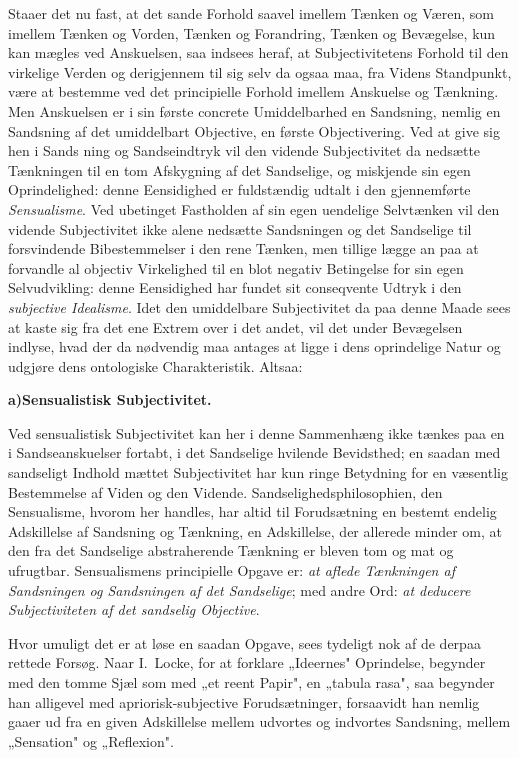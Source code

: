 \documentclass[12pt]{book}
\newcommand{\opage}[1]{\marginnote{\footnotesize\textit{[#1]}}}
\begin{document}
Staaer det nu fast, at det sande Forhold saavel imellem Tænken og Væren, som imellem
Tænken og Vorden, Tænken og Forandring, Tænken og Bevægelse, kun kan mægles ved
Anskuelsen, saa indsees heraf, at Subjectivitetens Forhold til den virkelige Verden og
derigjennem til sig selv da ogsaa maa, fra Videns Standpunkt, være at bestemme ved det
principielle Forhold imellem Anskuelse og Tænkning. Men Anskuelsen er i sin første
concrete Umiddelbarhed en Sandsning, nemlig en Sandsning af det umiddelbart Objective,
en første Objectivering. Ved at give sig hen i Sands%
\opage{24} ning og Sandseindtryk vil den vidende Subjectivitet da nedsætte Tænkningen til en tom
Afskygning af det Sandselige, og miskjende sin egen Oprindelighed: denne Eensidighed
er fuldstændig udtalt i den gjennemførte \emph{Sensualisme}. Ved ubetinget Fastholden
af sin egen uendelige Selvtænken vil den vidende Subjectivitet ikke alene nedsætte
Sandsningen og det Sandselige til forsvindende Bibestemmelser i den rene Tænken, men
tillige lægge an paa at forvandle al objectiv Virkelighed til en blot negativ
Betingelse for sin egen Selvudvikling: denne Eensidighed har fundet sit conseqvente
Udtryk i den \emph{subjective Idealisme}. Idet den umiddelbare Subjectivitet da paa
denne Maade sees at kaste sig fra det ene Extrem over i det andet, vil det under
Bevægelsen indlyse, hvad der da nødvendig maa antages at ligge i dens oprindelige
Natur og udgjøre dens ontologiske Charakteristik. Altsaa:

\begin{center}
{\bfseries a)\quad Sensualistisk Subjectivitet.}
\end{center}

Ved sensualistisk Subjectivitet kan her i denne Sammenhæng ikke tænkes paa en i
Sandseanskuelser fortabt, i det Sandselige hvilende Bevidsthed; en saadan med
sandseligt Indhold mættet Subjectivitet har kun ringe Betydning for en væsentlig
Bestemmelse af Viden og den Vidende. Sandselighedsphilosophien, den Sensualisme,
hvorom her handles, har altid til Forudsætning en bestemt endelig Adskillelse af
Sandsning og Tænkning, en Adskillelse, der allerede minder om, at den fra det
Sandselige abstraherende Tænkning er bleven tom og mat og ufrugtbar. Sensualismens
principielle Opgave er: \emph{at aflede Tænkningen af Sandsningen og Sandsningen af det
Sandselige}; med andre Ord: \emph{at deducere Subjectiviteten af det sandselig
Objective}.

Hvor umuligt det er at løse en saadan Opgave, sees tydeligt nok af de derpaa rettede
Forsøg. Naar I.\ Locke, for at forklare „Ideernes" Oprindelse, begynder med den tomme
Sjæl som med „et reent Papir", en „tabula rasa", saa
\opage{25} begynder han alligevel med apriorisk-subjective Forudsætninger, forsaavidt han
nemlig gaaer ud fra en given Adskillelse mellem udvortes og indvortes Sandsning,
mellem „Sensation" og „Reflexion".
\end{document}

